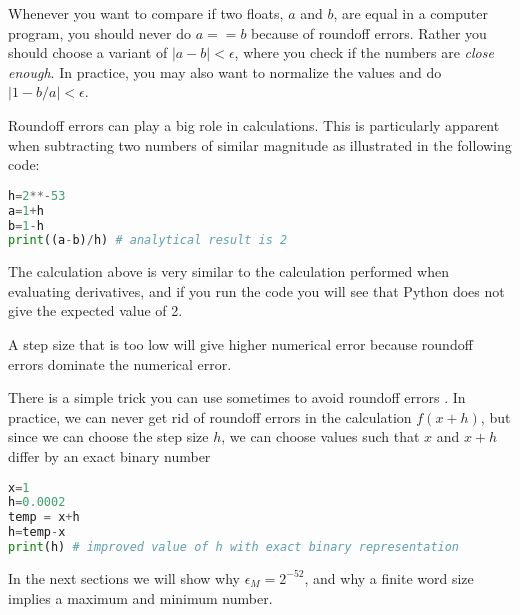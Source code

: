 \documentclass[graybox,sectrefs,envcountresetchap,open=right,final]{svmonodo}
\newenvironment{graybox2admon}[1][]{
\begin{graybox2mdframed}[frametitle=#1]
}
{
\end{graybox2mdframed}
}
\begin{document}
\begin{graybox2admon}[Comparing two floats]
Whenever you want to compare if two floats, $a$ and $b$, are equal in a computer program, you should never do $a==b$ because of roundoff errors. Rather you should choose a variant of $|a-b|<\epsilon$, where you check if the numbers are \emph{close enough}. In practice, you may also want to normalize the values and do $|1-b/a|<\epsilon$.
\end{graybox2admon}



Roundoff errors can play a big role in calculations. This is particularly apparent when subtracting two numbers of similar magnitude as illustrated in the following code:





\begin{lstlisting}[language=python,style=blue1bar]
h=2**-53
a=1+h
b=1-h
print((a-b)/h) # analytical result is 2

\end{lstlisting}

The calculation above is very similar to the calculation performed when evaluating derivatives, and if you run the code you will see that Python does not give the expected value of 2.


\begin{graybox2admon}[Choosing the right step size]
A step size that is too low will give higher numerical error because roundoff errors dominate the numerical error.
\end{graybox2admon}



There is a simple trick you can use sometimes to avoid roundoff errors \cite{flannery1992numerical}. In practice, we can never get rid of roundoff errors in the calculation $f(x+h)$, but since we can choose the step size $h$, we can choose values such that $x$ and $x+h$ differ by an exact binary number






\begin{lstlisting}[language=python,style=blue1bar]
x=1
h=0.0002 
temp = x+h
h=temp-x
print(h) # improved value of h with exact binary representation

\end{lstlisting}

In the next sections we will show why $\epsilon_M=2^{-52}$, and why a finite word size implies a maximum and minimum number.  
\end{document}
